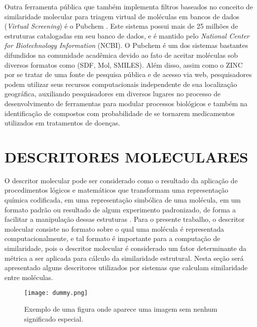 Outra ferramenta pública que também implementa filtros baseados no conceito de similaridade molecular para triagem virtual de moléculas em bancos de dados (\textit{Virtual Screening})   é o Pubchem \cite{li2010pubchem}. Este sistema possui mais de 25 milhões de estruturas catalogadas em seu banco de dados, e é mantido pelo \textit{National Center for Biotechnology Information} (NCBI). O Pubchem é um dos sistemas bastantes difundidos na comunidade acadêmica devido ao fato de aceitar moléculas sob diversos formatos como (SDF, Mol, SMILES). Além disso, assim como o ZINC \cite{irwin2005zinc} por se tratar de uma fonte de pesquisa pública e de acesso via web, pesquisadores podem utilizar seus recursos computacionais independente de sua localização geográfica, auxiliando pesquisadores em diversos lugares no processo de desenvolvimento de ferramentas para modular processos biológicos e também na identificação de compostos com probabilidade de se tornarem medicamentos utilizados em tratamentos de doenças.   

\section{DESCRITORES MOLECULARES}
O descritor molecular pode ser considerado como o resultado da aplicação de procedimentos lógicos e matemáticos que transformam uma representação química codificada, em uma representação simbólica de uma molécula, em um formato padrão ou resultado de algum experimento padronizado, de forma a facilitar a manipulação dessas estruturas \cite{todeschini2008handbook}. Para o presente trabalho, o descritor molecular consiste no formato sobre o qual uma molécula é representada computacionalmente, e tal formato é importante para a computação de
similaridade, pois o descritor molecular é considerado um fator determinante da métrica a ser
aplicada para cálculo da similaridade estrutural. Nesta seção será apresentado alguns
descritores utilizados por sistemas que calculam similaridade entre moléculas.


     

 

\begin{figure}[!htb]
	\centering
	\caption[Exemplo de uma figura]{Exemplo de uma figura onde aparece uma imagem sem nenhum significado especial.}
	\texttt{[image: dummy.png]} %
	\label{fig:dummy}
\end{figure}